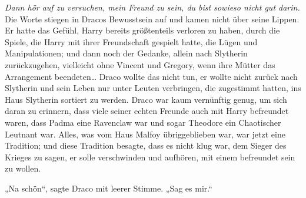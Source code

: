 \emph{Dann hör auf zu versuchen, mein Freund zu sein, du bist sowieso nicht gut darin.}
Die Worte stiegen in Dracos Bewusstsein auf und kamen nicht über seine Lippen. Er hatte das Gefühl, Harry bereits größtenteils verloren zu haben, durch die Spiele, die Harry mit ihrer Freundschaft gespielt hatte, die Lügen und Manipulationen; und dann noch der Gedanke, allein nach Slytherin zurückzugehen, vielleicht ohne Vincent und Gregory, wenn ihre Mütter das Arrangement beendeten… Draco wollte das nicht tun, er wollte nicht zurück nach Slytherin und sein Leben nur unter Leuten verbringen, die zugestimmt hatten, ins Haus Slytherin sortiert zu werden.
Draco war kaum vernünftig genug, um sich daran zu erinnern, dass viele seiner echten Freunde auch mit Harry befreundet waren, dass Padma eine Ravenclaw war und sogar Theodore ein Chaotischer Leutnant war. Alles, was vom Haus Malfoy übriggeblieben war, war jetzt eine Tradition; und diese Tradition besagte, dass es nicht klug war, dem Sieger des Krieges zu sagen, er solle verschwinden und aufhören, mit einem befreundet sein zu wollen.

„Na schön“, sagte Draco mit leerer Stimme. „Sag es mir.“

